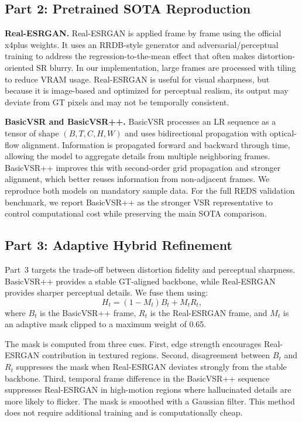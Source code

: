 \subsection{Part 2: Pretrained SOTA Reproduction}
\textbf{Real-ESRGAN.}
Real-ESRGAN is applied frame by frame using the official x4plus weights. It uses an RRDB-style generator and adversarial/perceptual training to address the regression-to-the-mean effect that often makes distortion-oriented SR blurry. In our implementation, large frames are processed with tiling to reduce VRAM usage. Real-ESRGAN is useful for visual sharpness, but because it is image-based and optimized for perceptual realism, its output may deviate from GT pixels and may not be temporally consistent.

\textbf{BasicVSR and BasicVSR++.}
BasicVSR processes an LR sequence as a tensor of shape $(B,T,C,H,W)$ and uses bidirectional propagation with optical-flow alignment. Information is propagated forward and backward through time, allowing the model to aggregate details from multiple neighboring frames. BasicVSR++ improves this with second-order grid propagation and stronger alignment, which better reuses information from non-adjacent frames. We reproduce both models on mandatory sample data. For the full REDS validation benchmark, we report BasicVSR++ as the stronger VSR representative to control computational cost while preserving the main SOTA comparison.

\subsection{Part 3: Adaptive Hybrid Refinement}
Part~3 targets the trade-off between distortion fidelity and perceptual sharpness. BasicVSR++ provides a stable GT-aligned backbone, while Real-ESRGAN provides sharper perceptual details. We fuse them using:
\begin{equation}
H_t = (1 - M_t)B_t + M_tR_t,
\end{equation}
where $B_t$ is the BasicVSR++ frame, $R_t$ is the Real-ESRGAN frame, and $M_t$ is an adaptive mask clipped to a maximum weight of 0.65.

The mask is computed from three cues. First, edge strength encourages Real-ESRGAN contribution in textured regions. Second, disagreement between $B_t$ and $R_t$ suppresses the mask when Real-ESRGAN deviates strongly from the stable backbone. Third, temporal frame difference in the BasicVSR++ sequence suppresses Real-ESRGAN in high-motion regions where hallucinated details are more likely to flicker. The mask is smoothed with a Gaussian filter. This method does not require additional training and is computationally cheap.

